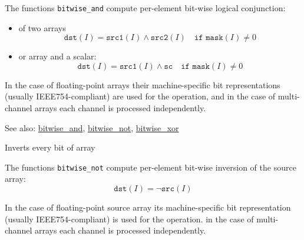 \begin{description}
\end{description}

The functions \texttt{bitwise\_and} compute per-element bit-wise logical conjunction:
\begin{itemize}
    \item of two arrays
    \[\texttt{dst}(I) = \texttt{src1}(I) \wedge \texttt{src2}(I)\quad\texttt{if mask}(I)\ne0\]
    \item or array and a scalar:
    \[\texttt{dst}(I) = \texttt{src1}(I) \wedge \texttt{sc}\quad\texttt{if mask}(I)\ne0\]
\end{itemize}

In the case of floating-point arrays their machine-specific bit representations (usually IEEE754-compliant) are used for the operation, and in the case of multi-channel arrays each channel is processed independently.

See also: \hyperref[cppfunc.bitwise.and]{bitwise\_and}, \hyperref[cppfunc.bitwise.not]{bitwise\_not}, \hyperref[cppfunc.bitwise.xor]{bitwise\_xor}

\label{cppfunc.bitwise.not}
Inverts every bit of array

\begin{description}
\end{description}

The functions \texttt{bitwise\_not} compute per-element bit-wise inversion of the source array:
\[\texttt{dst}(I) = \neg\texttt{src}(I)\]

In the case of floating-point source array its machine-specific bit representation (usually IEEE754-compliant) is used for the operation. in the case of multi-channel arrays each channel is processed independently.

